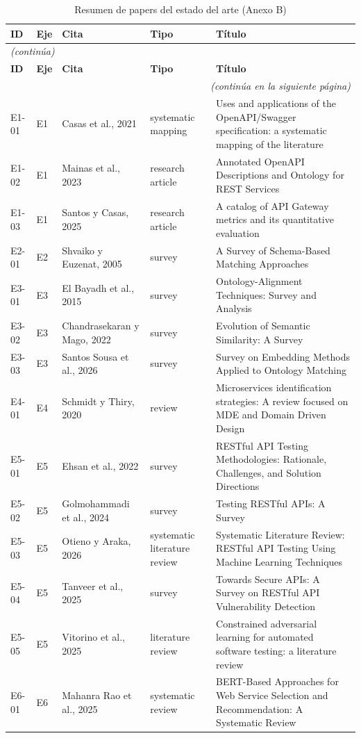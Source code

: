 \begin{longtable}{@{}p{}p{}p{}p{}p{}@{}}
\caption{Resumen de papers del estado del arte (Anexo B)} \label{tab:anexo-b} \\
\toprule
\textbf{ID} & \textbf{Eje} & \textbf{Cita} & \textbf{Tipo} & \textbf{Título} \\
\midrule
\endfirsthead
\multicolumn{5}{l}{\textit{(continúa)}} \\
\midrule
\textbf{ID} & \textbf{Eje} & \textbf{Cita} & \textbf{Tipo} & \textbf{Título} \\
\midrule
\endhead
\midrule
\multicolumn{5}{r}{\textit{(continúa en la siguiente página)}} \\
\endfoot
\bottomrule
\endlastfoot
E1-01 & E1 & Casas et al., 2021 & systematic mapping & Uses and applications of the OpenAPI/Swagger specification: a systematic mapping of the literature \\
E1-02 & E1 & Mainas et al., 2023 & research article & Annotated OpenAPI Descriptions and Ontology for REST Services \\
E1-03 & E1 & Santos y Casas, 2025 & research article & A catalog of API Gateway metrics and its quantitative evaluation \\
E2-01 & E2 & Shvaiko y Euzenat, 2005 & survey & A Survey of Schema-Based Matching Approaches \\
E3-01 & E3 & El Bayadh et al., 2015 & survey & Ontology-Alignment Techniques: Survey and Analysis \\
E3-02 & E3 & Chandrasekaran y Mago, 2022 & survey & Evolution of Semantic Similarity: A Survey \\
E3-03 & E3 & Santos Sousa et al., 2026 & survey & Survey on Embedding Methods Applied to Ontology Matching \\
E4-01 & E4 & Schmidt y Thiry, 2020 & review & Microservices identification strategies: A review focused on MDE and Domain Driven Design \\
E5-01 & E5 & Ehsan et al., 2022 & survey & RESTful API Testing Methodologies: Rationale, Challenges, and Solution Directions \\
E5-02 & E5 & Golmohammadi et al., 2024 & survey & Testing RESTful APIs: A Survey \\
E5-03 & E5 & Otieno y Araka, 2026 & systematic literature review & Systematic Literature Review: RESTful API Testing Using Machine Learning Techniques \\
E5-04 & E5 & Tanveer et al., 2025 & survey & Towards Secure APIs: A Survey on RESTful API Vulnerability Detection \\
E5-05 & E5 & Vitorino et al., 2025 & literature review & Constrained adversarial learning for automated software testing: a literature review \\
E6-01 & E6 & Mahanra Rao et al., 2025 & systematic review & BERT-Based Approaches for Web Service Selection and Recommendation: A Systematic Review \\
\end{longtable}
